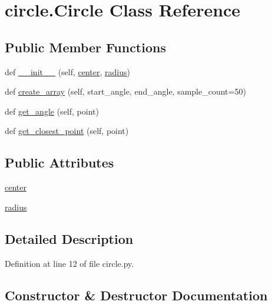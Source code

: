 \hypertarget{classcircle_1_1_circle}{}\section{circle.\+Circle Class Reference}
\label{classcircle_1_1_circle}
\subsection*{Public Member Functions}
\begin{DoxyCompactItemize}
\item 
def \hyperlink{classcircle_1_1_circle_ae5573aa3ec1e6df913e13c01cf3ed7b9}{\+\_\+\+\_\+init\+\_\+\+\_\+} (self, \hyperlink{classcircle_1_1_circle_aa2ed466736c7e4436ab6ded456ebd24b}{center}, \hyperlink{classcircle_1_1_circle_a33aec6cd768f0a1850fae92cf3fcbc95}{radius})
\item 
def \hyperlink{classcircle_1_1_circle_a95ddced3abdbd659ea243a1d420a8c6c}{create\+\_\+array} (self, start\+\_\+angle, end\+\_\+angle, sample\+\_\+count=50)
\item 
def \hyperlink{classcircle_1_1_circle_a1ec1a241492841bc729e660788684407}{get\+\_\+angle} (self, point)
\item 
def \hyperlink{classcircle_1_1_circle_a191eb7323e7138ce625cc345822bff17}{get\+\_\+closest\+\_\+point} (self, point)
\end{DoxyCompactItemize}
\subsection*{Public Attributes}
\begin{DoxyCompactItemize}
\item 
\hyperlink{classcircle_1_1_circle_aa2ed466736c7e4436ab6ded456ebd24b}{center}
\item 
\hyperlink{classcircle_1_1_circle_a33aec6cd768f0a1850fae92cf3fcbc95}{radius}
\end{DoxyCompactItemize}


\subsection{Detailed Description}


Definition at line 12 of file circle.\+py.



\subsection{Constructor \& Destructor Documentation}
